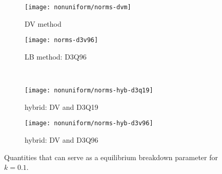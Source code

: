 \documentclass[]{elsarticle} %
\begin{document}
\begin{comment} ### [Rogozin] Seems that results for k=0.3 do not show us smth new
\begin{figure}
   \centering
   \begin{subfigure}[b]{0.5\textwidth}
       \texttt{[image: d3q19-k0\_3]}
       \caption{ (D3Q19)}
       \label{fig:d3q19-k03}
   \end{subfigure}%
   \begin{subfigure}[b]{0.5\textwidth}
       \texttt{[image: d3v96-k0\_3.pdf]}
       \caption{ (D3Q96)}
       \label{fig:d3v96_k03}
   \end{subfigure}\\
   \begin{subfigure}[b]{0.5\textwidth}
       \includegraphics[width=\textwidth]
       {hyb-d3q19-k0_3.pdf}
       \caption{hybrid (DV and D3Q19)}
       \label{fig:hyb:d3q19-k03}
   \end{subfigure}%
   \begin{subfigure}[b]{0.5\textwidth}
       \includegraphics[width=\textwidth]
       {hyb-d3v96-k0_3.pdf}
       \caption{hybrid (DV and D3Q96)}
       \label{fig:hyb:d3v96_k03}
   \end{subfigure}
   \caption{
       Numerical solution of the Couette-flow problem for $k=0.3$ obtained by the proposed hybrid method.
       The matching point is placed  at the  distance $1.2 Kn$ from the  boundary.
       The black lines are the high-accuracy solution for the BGK model.
       The black boxes correspond to the tabulated solutions~\cite{Luo2015, Luo2016}.
   }\label{fig:hybrid03}
\end{figure}
\end{comment}

\begin{figure}
    \centering
    \begin{subfigure}[b]{0.5\textwidth}
        \texttt{[image: nonuniform/norms-dvm]}
        \caption{DV method}
        \label{fig:norms:dvm}
    \end{subfigure}%
    \begin{subfigure}[b]{0.5\textwidth}
        \texttt{[image: norms-d3v96]}
        \caption{LB method: D3Q96}
        \label{fig:norms:d3q96}
    \end{subfigure}\\
    \begin{subfigure}[b]{0.5\textwidth}
        \texttt{[image: nonuniform/norms-hyb-d3q19]}
        \caption{hybrid: DV and D3Q19}
        \label{fig:norms:d3q19-hyb}
    \end{subfigure}%
    \begin{subfigure}[b]{0.5\textwidth}
        \texttt{[image: nonuniform/norms-hyb-d3v96]}
        \caption{hybrid: DV and D3Q96}
        \label{fig:norms:d3q96-hyb}
    \end{subfigure}
    \caption{
       Quantities that can serve as a equilibrium breakdown parameter for \(k=0.1\).
    }\label{fig:norms}
\end{figure}
\end{document}
